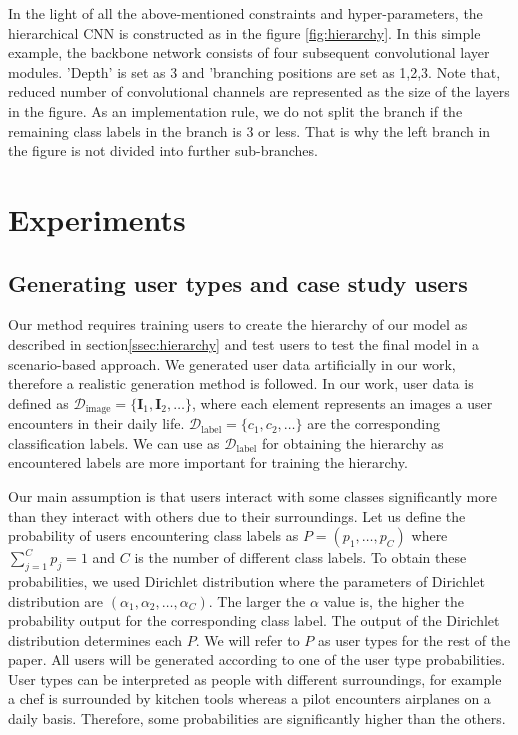 In the light of all the above-mentioned constraints and hyper-parameters, the hierarchical CNN is constructed as in the figure \ref{fig:hierarchy}. 
In this simple example, the backbone network consists of four subsequent convolutional layer modules. 
'Depth' is set as 3 and 'branching positions are set as 1,2,3. 
Note that, reduced number of convolutional channels are represented as the size of the layers in the figure.
As an implementation rule, we do not split the branch if the remaining class labels in the branch is 3 or less. 
That is why the left branch in the figure is not divided into further sub-branches.

\section{Experiments}

\subsection{Generating user types and case study users}
\label{ssec:genusers}

Our method requires training users to create the hierarchy of our model as described in section\ref{ssec:hierarchy} and test users to test the final model in a scenario-based approach. 
We generated user data artificially in our work, therefore a realistic generation method is followed.
In our work, user data is defined as $\mathcal{D}_\mathrm{image} = \{\mathbf{I}_1,\mathbf{I}_2,\dots\}$, where each element represents an images a user encounters in their daily life. 
$\mathcal{D}_\mathrm{label} = \{c_1,c_2,\dots\}$ are the corresponding classification labels.
We can use as $\mathcal{D}_\mathrm{label}$ for obtaining the hierarchy as encountered labels are more important for training the hierarchy.

Our main assumption is that users interact with some classes significantly more than they interact with others due to their surroundings. 
Let us define the probability of users encountering class labels as $P=(p_1, \dots, p_C)$ where $\sum_{j=1}^C p_j = 1$ and $C$ is the number of different class labels.
To obtain these probabilities, we used Dirichlet distribution where the parameters of Dirichlet distribution are $(\alpha_1, \alpha_2, \dots, \alpha_C)$. 
The larger the $\alpha$ value is, the higher the probability output for the corresponding class label.
The output of the Dirichlet distribution determines each $P$.
We will refer to $P$ as user types for the rest of the paper.
All users will be generated according to one of the user type probabilities. 
User types can be interpreted as people with different surroundings, 
for example a chef is surrounded by kitchen tools whereas a pilot encounters airplanes on a daily basis.
Therefore, some probabilities are significantly higher than the others.

